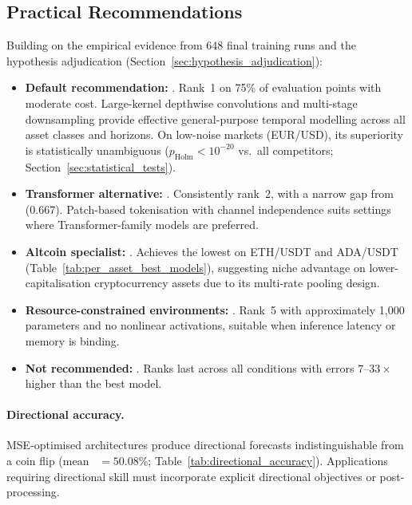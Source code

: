 \subsection{Practical Recommendations}
\label{sec:recommendations}

Building on the empirical evidence from 648 final training runs and the hypothesis adjudication (Section~\ref{sec:hypothesis_adjudication}):

\begin{itemize}[nosep]
  \item \textbf{Default recommendation:} \moderntcn.  Rank~1 on 75\% of evaluation points with moderate cost.  Large-kernel depthwise convolutions and multi-stage downsampling provide effective general-purpose temporal modelling across all asset classes and horizons.  On low-noise markets (EUR/USD), its superiority is statistically unambiguous ($p_\text{Holm} < 10^{-20}$ vs.\ all competitors; Section~\ref{sec:statistical_tests}).

  \item \textbf{Transformer alternative:} \patchtst.  Consistently rank~2, with a narrow gap from \moderntcn (0.667).  Patch-based tokenisation with channel independence suits settings where Transformer-family models are preferred.

  \item \textbf{Altcoin specialist:} \nhits.  Achieves the lowest \rmse on ETH/USDT and ADA/USDT (Table~\ref{tab:per_asset_best_models}), suggesting niche advantage on lower-capitalisation cryptocurrency assets due to its multi-rate pooling design.

  \item \textbf{Resource-constrained environments:} \dlinear.  Rank~5 with approximately 1{,}000 parameters and no nonlinear activations, suitable when inference latency or memory is binding.

  \item \textbf{Not recommended:} \lstm.  Ranks last across all conditions with errors $7$--$33\times$ higher than the best model.
\end{itemize}

\paragraph{Directional accuracy.}  MSE-optimised architectures produce directional forecasts indistinguishable from a coin flip (mean \da~$= 50.08\%$; Table~\ref{tab:directional_accuracy}).  Applications requiring directional skill must incorporate explicit directional objectives or post-processing.

